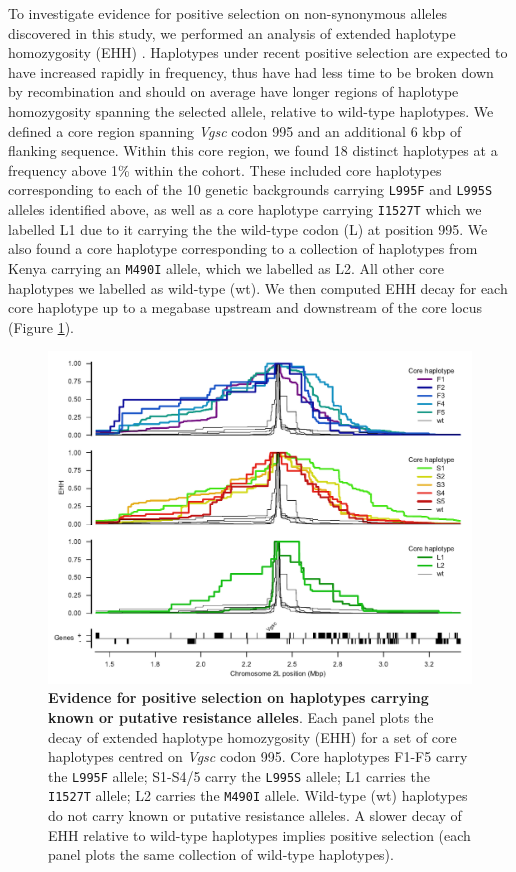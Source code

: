 \documentclass[a4paper,11pt,abstracton,hidelinks]{scrartcl}
\begin{document}
%
To investigate evidence for positive selection on non-synonymous alleles discovered in this study, we performed an analysis of extended haplotype homozygosity (EHH) \cite{Sabeti2002}.
%
Haplotypes under recent positive selection are expected to have increased rapidly in frequency, thus have had less time to be broken down by recombination and should on average have longer regions of haplotype homozygosity spanning the selected allele, relative to wild-type haplotypes.
%
We defined a core region spanning \textit{Vgsc} codon 995 and an additional 6 kbp of flanking sequence.
%
Within this core region, we found 18 distinct haplotypes at a frequency above 1\% within the cohort.
%
These included core haplotypes corresponding to each of the 10 genetic backgrounds carrying \texttt{L995F} and \texttt{L995S} alleles identified above, as well as a core haplotype carrying \texttt{I1527T} which we labelled L1 due to it carrying the the wild-type codon (L) at position 995.
%
We also found a core haplotype corresponding to a collection of haplotypes from Kenya carrying an \texttt{M490I} allele, which we labelled as L2.
%
All other core haplotypes we labelled as wild-type (wt).
%
We then computed EHH decay for each core haplotype up to a megabase upstream and downstream of the core locus (Figure \ref{fig:ehh_decay}).
%


%
\begin{figure}[!t]
  \includegraphics[width=1.1\linewidth,center]{artwork/ehh_decay_old_clusters.pdf}
  \caption{\textbf{Evidence for positive selection on haplotypes carrying known or putative resistance alleles}. Each panel plots the decay of extended haplotype homozygosity (EHH) for a set of core haplotypes centred on \textit{Vgsc} codon 995. Core haplotypes F1-F5 carry the \texttt{L995F} allele; S1-S4/5 carry the \texttt{L995S} allele; L1 carries the \texttt{I1527T} allele; L2 carries the \texttt{M490I} allele. Wild-type (wt) haplotypes do not carry known or putative resistance alleles. A slower decay of EHH relative to wild-type haplotypes implies positive selection (each panel plots the same collection of wild-type haplotypes).}
  \label{fig:ehh_decay}
\end{figure}
\end{document}
